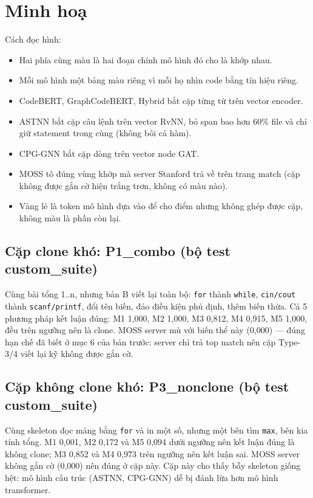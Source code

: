 \documentclass[11pt,a4paper]{article}
\begin{document}
\section{Minh hoạ}
Cách đọc hình:
\begin{itemize}[leftmargin=*,itemsep=0pt,topsep=2pt,parsep=0pt]
\item Hai phía cùng màu là hai đoạn chính mô hình đó cho là khớp nhau.
\item Mỗi mô hình một bảng màu riêng vì mỗi họ nhìn code bằng tín hiệu riêng.
\item CodeBERT, GraphCodeBERT, Hybrid bắt cặp từng từ trên vector encoder.
\item ASTNN bắt cặp câu lệnh trên vector RvNN, bỏ span bao hơn 60\% file
  và chỉ giữ statement trong cùng (không bôi cả hàm).
\item CPG-GNN bắt cặp dòng trên vector node GAT.
\item MOSS tô đúng vùng khớp mà server Stanford trả về trên trang match
(cặp không được gắn cờ hiện trắng trơn, không có màu nào).
\item \colorbox{evyellow!30}{Vàng} lẻ là token mô hình dựa vào để cho điểm
  nhưng không ghép được cặp, không màu là phần còn lại.
\end{itemize}

\subsection{Cặp clone khó: P1\_combo (bộ test custom\_suite)}
Cùng bài tổng 1..n, nhưng bản B viết lại toàn bộ: \texttt{for} thành
\texttt{while}, \texttt{cin/cout} thành \texttt{scanf/printf}, đổi tên biến,
đảo điều kiện phủ định, thêm biến thừa.
Cả 5 phương pháp kết luận đúng: M1 1,000, M2 1,000,
M3 0,812, M4 0,915, M5 1,000, đều trên ngưỡng nên là clone.
MOSS server mù với biến thể này (0,000) — đúng hạn chế đã biết ở mục 6
của bản trước: server chỉ trả top match nên cặp Type-3/4 viết lại kỹ không
được gắn cờ.
{
}

\subsection{Cặp không clone khó: P3\_nonclone (bộ test custom\_suite)}
Cùng skeleton đọc mảng bằng \texttt{for} và in một số, nhưng một bên tìm
\texttt{max}, bên kia tính tổng.
M1 0,001, M2 0,172 và M5 0,094 dưới ngưỡng nên kết luận đúng là không clone;
M3 0,852 và M4 0,973 trên ngưỡng nên kết luận sai.
MOSS server không gắn cờ (0,000) nên đúng ở cặp này.
Cặp này cho thấy bẫy skeleton giống hệt: mô hình cấu trúc (ASTNN, CPG-GNN)
dễ bị đánh lừa hơn mô hình transformer.
{
}
\end{document}
